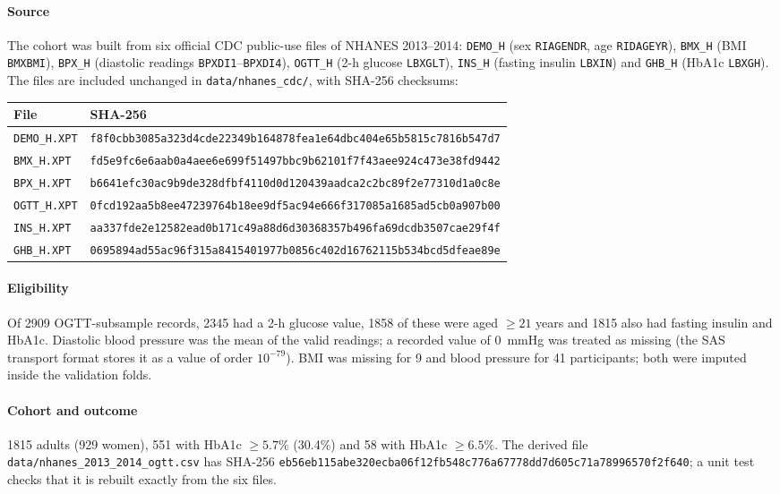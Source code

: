\documentclass[11pt]{article}
\begin{document}
\paragraph{Source} The cohort was built from six official CDC public-use files of NHANES 2013--2014: \texttt{DEMO\_H} (sex \texttt{RIAGENDR}, age \texttt{RIDAGEYR}), \texttt{BMX\_H} (BMI \texttt{BMXBMI}), \texttt{BPX\_H} (diastolic readings \texttt{BPXDI1}--\texttt{BPXDI4}), \texttt{OGTT\_H} (2-h glucose \texttt{LBXGLT}), \texttt{INS\_H} (fasting insulin \texttt{LBXIN}) and \texttt{GHB\_H} (HbA1c \texttt{LBXGH}). The files are included unchanged in \texttt{data/nhanes\_cdc/}, with SHA-256 checksums:
\begin{center}\small
\begin{tabular}{ll}
\toprule
File & SHA-256 \\
\midrule
\texttt{DEMO\_H.XPT} & \texttt{f8f0cbb3085a323d4cde22349b164878fea1e64dbc404e65b5815c7816b547d7} \\
\texttt{BMX\_H.XPT} & \texttt{fd5e9fc6e6aab0a4aee6e699f51497bbc9b62101f7f43aee924c473e38fd9442} \\
\texttt{BPX\_H.XPT} & \texttt{b6641efc30ac9b9de328dfbf4110d0d120439aadca2c2bc89f2e77310d1a0c8e} \\
\texttt{OGTT\_H.XPT} & \texttt{0fcd192aa5b8ee47239764b18ee9df5ac94e666f317085a1685ad5cb0a907b00} \\
\texttt{INS\_H.XPT} & \texttt{aa337fde2e12582ead0b171c49a88d6d30368357b496fa69dcdb3507cae29f4f} \\
\texttt{GHB\_H.XPT} & \texttt{0695894ad55ac96f315a8415401977b0856c402d16762115b534bcd5dfeae89e} \\
\bottomrule
\end{tabular}
\end{center}

\paragraph{Eligibility} Of 2909 OGTT-subsample records, 2345 had a 2-h glucose value, 1858 of these were aged $\geq 21$ years and 1815 also had fasting insulin and HbA1c. Diastolic blood pressure was the mean of the valid readings; a recorded value of 0~mmHg was treated as missing (the SAS transport format stores it as a value of order $10^{-79}$). BMI was missing for 9 and blood pressure for 41 participants; both were imputed inside the validation folds.

\paragraph{Cohort and outcome} 1815 adults (929 women), 551 with HbA1c $\geq 5.7\%$ (30.4\%) and 58 with HbA1c $\geq 6.5\%$. The derived file \texttt{data/nhanes\_2013\_2014\_ogtt.csv} has SHA-256 \nolinkurl{eb56eb115abe320ecba06f12fb548c776a67778dd7d605c71a78996570f2f640}; a unit test checks that it is rebuilt exactly from the six files.
\end{document}
